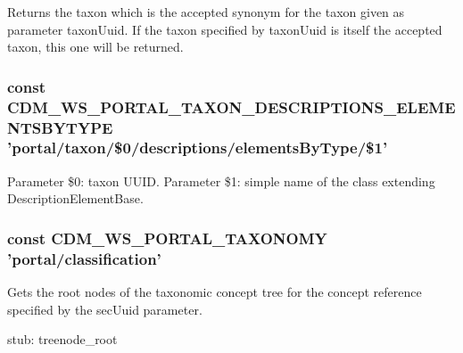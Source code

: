 Returns the taxon which is the accepted synonym for the taxon given as parameter taxon\-Uuid. If the taxon specified by taxon\-Uuid is itself the accepted taxon, this one will be returned. \hypertarget{webservice__uris_8php_a159d7ce2a69890c3c03ae938c2313247}{
\subsubsection[{C\-D\-M\-\_\-\-W\-S\-\_\-\-P\-O\-R\-T\-A\-L\-\_\-\-T\-A\-X\-O\-N\-\_\-\-D\-E\-S\-C\-R\-I\-P\-T\-I\-O\-N\-S\-\_\-\-E\-L\-E\-M\-E\-N\-T\-S\-B\-Y\-T\-Y\-P\-E}]{\setlength{\rightskip}{0pt plus 5cm}const C\-D\-M\-\_\-\-W\-S\-\_\-\-P\-O\-R\-T\-A\-L\-\_\-\-T\-A\-X\-O\-N\-\_\-\-D\-E\-S\-C\-R\-I\-P\-T\-I\-O\-N\-S\-\_\-\-E\-L\-E\-M\-E\-N\-T\-S\-B\-Y\-T\-Y\-P\-E 'portal/taxon/\$0/descriptions/elements\-By\-Type/\$1'}}\label{webservice__uris_8php_a159d7ce2a69890c3c03ae938c2313247}
Parameter \$0\-: taxon U\-U\-I\-D. Parameter \$1\-: simple name of the class extending Description\-Element\-Base. \hypertarget{webservice__uris_8php_a34b556d66b797c90ccd91145c4a89b02}{
\subsubsection[{C\-D\-M\-\_\-\-W\-S\-\_\-\-P\-O\-R\-T\-A\-L\-\_\-\-T\-A\-X\-O\-N\-O\-M\-Y}]{\setlength{\rightskip}{0pt plus 5cm}const C\-D\-M\-\_\-\-W\-S\-\_\-\-P\-O\-R\-T\-A\-L\-\_\-\-T\-A\-X\-O\-N\-O\-M\-Y 'portal/classification'}}\label{webservice__uris_8php_a34b556d66b797c90ccd91145c4a89b02}
Gets the root nodes of the taxonomic concept tree for the concept reference specified by the sec\-Uuid parameter.

stub\-: treenode\-\_\-root 